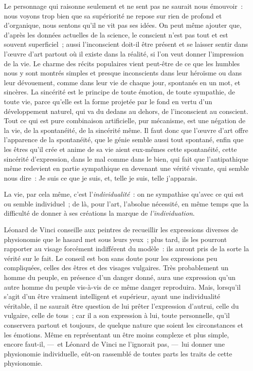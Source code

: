 \documentclass[french,twoside]{book} %
\begin{document}
Le personnage qui raisonne seulement et ne sent pas ne saurait nous émouvoir : nous voyons trop bien que sa supériorité ne repose sur rien de profond et d’organique, nous sentons qu’il ne vit pas ses idées. On peut même ajouter que, d’après les données actuelles de la science, le conscient n’est pas tout et est souvent superficiel ; aussi l’inconscient doit-il être présent et se laisser sentir dans l’œuvre d’art partout où il existe dans la réalité, si l’on veut donner l’impression de la vie. Le charme des récits populaires vient peut-être de ce que les humbles nous y sont montrés simples et presque inconscients dans leur héroïsme ou dans leur dévouement, comme dans leur vie de chaque jour, spontanés en un mot, et sincères. La sincérité est le principe de toute émotion, de toute sympathie, de toute vie, parce qu’elle est la forme projetée par le fond en vertu d’un développement naturel, qui va du dedans au dehors, de l’inconscient au conscient. Tout ce qui est pure combinaison artificielle, pur mécanisme, est une négation de la vie, de la spontanéité, de la sincérité même. Il faut donc que l’œuvre d’art offre l’apparence de la spontanéité, que le génie semble aussi tout spontané, enfin que les êtres qu’il crée et anime de sa vie aient eux-mêmes cette spontanéité, cette sincérité d’expression, dans le mal comme dans le bien, qui fait que l’antipathique même redevient en partie sympathique en devenant une vérité vivante, qui semble nous dire : Je suis ce que je suis, et, telle je suis, telle j’apparais.\par
La vie, par cela même, c’est l’\emph{individualité} : on ne sympathise qu’avec ce qui est ou semble individuel ; de là, pour l’art, l’absolue nécessité, en même temps que la difficulté de donner à ses créations la marque de \emph{l’individuation}.\par
Léonard de Vinci conseille aux peintres de recueillir les expressions diverses de physionomie que le hasard met sous leurs yeux ; plus tard, ils les pourront rapporter au visage forcément indifférent du modèle : ils auront pris de la sorte la vérité sur le fait. Le conseil est bon sans doute pour les expressions peu compliquées, celles des êtres et des visages vulgaires. Très probablement un homme du peuple, en présence d’un danger donné, aura une expression qu’un autre homme du peuple vis-à-vis de ce même danger reproduira. Mais, lorsqu’il s’agit d’un être vraiment intelligent et supérieur, ayant une individualité véritable, il ne saurait être question de lui prêter l’expression d’autrui, celle du vulgaire, celle de tous ; car il a son expression à lui, toute personnelle, qu’il conservera partout et toujours, de quelque nature que soient les circonstances et les émotions. Même en représentant un être moins complexe et plus simple, encore faut-il, — et Léonard de Vinci ne l’ignorait pas, — lui donner une physionomie individuelle, eût-on rassemblé de toutes parts les traits de cette physionomie.\par
\end{document}

